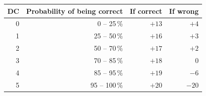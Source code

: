 \begin{center}
\small
\renewcommand{\arraystretch}{1.15}
\begin{tabular}{rrrr}
\toprule
\textbf{DC} & \textbf{Probability of being correct} & \textbf{If correct} & \textbf{If wrong}\\
\midrule
0 & 0 -- 25\,\%   & $+13$ & $+4$\\
1 & 25 -- 50\,\%  & $+16$ & $+3$\\
2 & 50 -- 70\,\%  & $+17$ & $+2$\\
3 & 70 -- 85\,\%  & $+18$ & $0$\\
4 & 85 -- 95\,\%  & $+19$ & $-6$\\
5 & 95 -- 100\,\% & $+20$ & $-20$\\
\bottomrule
\end{tabular}
\end{center}
